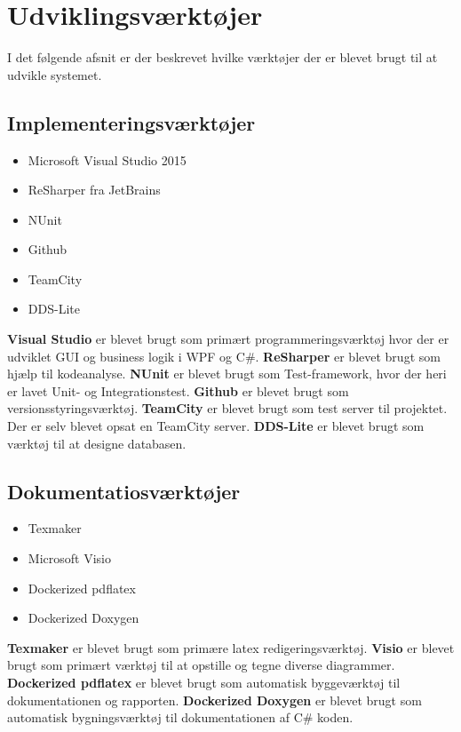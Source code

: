 \section{Udviklingsværktøjer}
\label{developmentstool}
I det følgende afsnit er der beskrevet hvilke værktøjer der er blevet brugt til at udvikle systemet. 

\subsection*{Implementeringsværktøjer}
\begin{itemize}
	\item Microsoft Visual Studio 2015
	\item ReSharper fra JetBrains
	\item NUnit 
	\item Github
	\item TeamCity
	\item DDS-Lite	
\end{itemize}
\textbf{Visual Studio} er blevet brugt som primært programmeringsværktøj hvor der er udviklet GUI og business logik i WPF og C\#. \textbf{ReSharper} er blevet brugt som hjælp til kodeanalyse. \textbf{NUnit} er blevet brugt som Test-framework, hvor der heri er lavet Unit- og Integrationstest. \textbf{Github} er blevet brugt som  versionsstyringsværktøj. \textbf{TeamCity} er blevet brugt som test server til projektet. Der er selv blevet opsat en TeamCity server. \textbf{DDS-Lite} er blevet brugt som værktøj til at designe databasen. 

\subsection*{Dokumentatiosværktøjer}
\begin{itemize}
	\item Texmaker
	\item Microsoft Visio
	\item Dockerized pdflatex
	\item Dockerized Doxygen
\end{itemize}
\textbf{Texmaker} er blevet brugt som primære latex redigeringsværktøj. \textbf{Visio} er blevet brugt som primært værktøj til at opstille og tegne diverse diagrammer. \textbf{Dockerized pdflatex} er blevet brugt som automatisk byggeværktøj til dokumentationen og rapporten. \textbf{Dockerized Doxygen} er blevet brugt som automatisk bygningsværktøj til dokumentationen af C\# koden. 